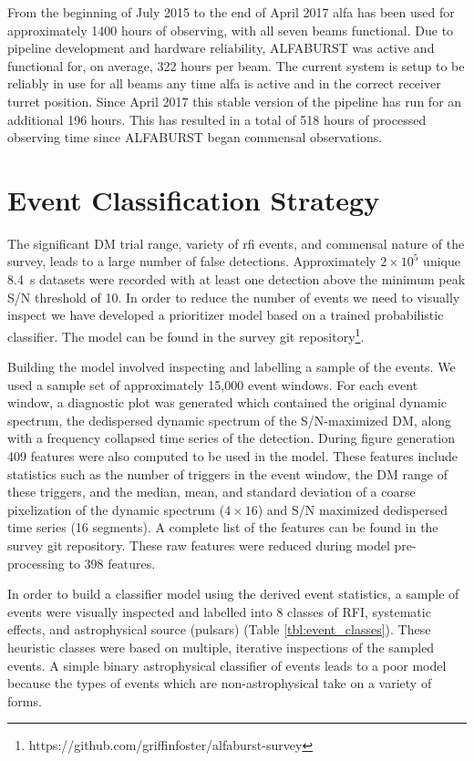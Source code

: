 \documentclass[a4paper,fleqn,usenatbib]{mnras}
\begin{document}
From the beginning of July 2015 to the end of April 2017 \gls{alfa} has been
used for approximately 1400 hours of observing, with all seven beams functional.
Due to pipeline development and hardware reliability, ALFABURST was active and
functional for, on average, 322 hours per beam.  The current system is setup to
be reliably in use for all beams any time \gls{alfa} is active and in the
correct receiver turret position. Since April 2017 this stable version of the
pipeline has run for an additional 196 hours. This has resulted in a total of
518 hours of processed observing time since ALFABURST began commensal observations.



\section{Event Classification Strategy}
\label{sec:event_classify}

The significant DM trial range, variety of \gls{rfi} events, and commensal
nature of the survey, leads to a large number of false detections.
Approximately $2 \times 10^5$ unique 8.4~s datasets were recorded with at least
one detection above the minimum peak S/N threshold of 10. In order to reduce the
number of events we need to visually inspect we have developed a prioritizer
model based on a trained probabilistic classifier. The model can be found in the
survey git
repository\footnote{https://github.com/griffinfoster/alfaburst-survey}.

Building the model involved inspecting and labelling a sample of the events. We
used a sample set of approximately 15,000 event windows.  For each event window,
a diagnostic plot was generated which contained the original dynamic spectrum,
the dedispersed dynamic spectrum of the S/N-maximized DM, along with a frequency
collapsed time series of the detection.  During figure generation 409 features
were also computed to be used in the model.  These features include statistics
such as the number of triggers in the event window, the DM range of these
triggers, and the median, mean, and standard deviation of a coarse pixelization
of the dynamic spectrum ($4 \times 16$) and S/N maximized dedispersed time
series (16 segments). A complete list of the features can be found in the
survey git repository. These raw features were reduced during model
pre-processing to 398 features.

In order to build a classifier model using the derived event statistics, a
sample of events were visually inspected and labelled into 8 classes of RFI,
systematic effects, and astrophysical source (pulsars) (Table
\ref{tbl:event_classes}). These heuristic classes were based on multiple,
iterative inspections of the sampled events. A simple binary astrophysical
classifier of events leads to a poor model because the types of events which
are non-astrophysical take on a variety of forms.
\end{document}
